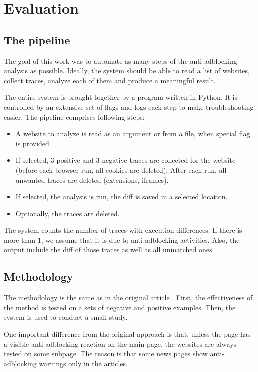 \chapter{Evaluation}
\label{evaluation}

\section{The pipeline}

The goal of this work was to automate as many steps of the anti-adblocking analysis as possible.
Ideally, the system should be able to read a list of websites, collect traces, analyze
each of them and produce a meaningful result.

The entire system is brought together by a program written in Python.
It is controlled by an extensive set of flags and logs each step to make troubleshooting easier.
The pipeline comprises following steps:
\begin{itemize}
  \item A website to analyze is read as an argument or from a file, when special flag is provided.
  \item If selected, 3 positive and 3 negative traces are collected for the website (before each browser run,
           all cookies are deleted). After each run, all unwanted traces are deleted (extensions, iframes).
  \item If selected, the analysis is run, the diff is saved in a selected location.
  \item Optionally, the traces are deleted.
\end{itemize}

The system counts the number of traces with execution differences.
If there is more than 1, we assume that it is due to anti-adblocking activities.
Also, the output include the diff of those traces as well as all unmatched ones.

\section{Methodology}
\label{methodology}

The methodology is the same as in the original article \cite{DBLP:conf/ndss/ZhuHQSY18}.
First, the effectiveness of the method is tested on a sets of negative and positive examples.
Then, the system is used to conduct a small study.

One important difference from the original approach is that, unless the page has a visible anti-adblocking
reaction on the main page, the websites are always tested on some subpage. The reason is that
some news pages show anti-adblocking warnings only in the articles.

